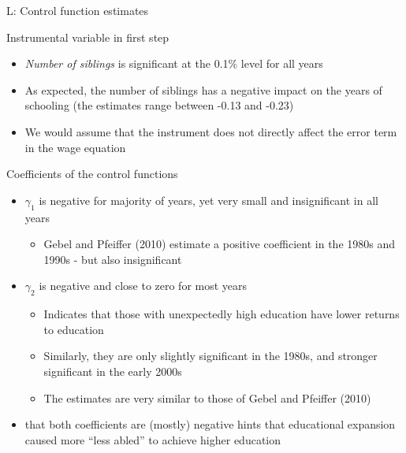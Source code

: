 \documentclass[10pt,ignorenonframetext,]{beamer}
\providecommand{\tightlist}{%
  \setlength{\itemsep}{0pt}\setlength{\parskip}{0pt}}
\begin{document}
\begin{frame}[allowframebreaks]{L: Control function estimates}
\protect\hypertarget{l-control-function-estimates}{}

Instrumental variable in first step

\begin{itemize}
\tightlist
\item
  \emph{Number of siblings} is significant at the 0.1\% level for all
  years
\item
  As expected, the number of siblings has a negative impact on the years
  of schooling (the estimates range between -0.13 and -0.23)
\item
  We would assume that the instrument does not directly affect the error
  term in the wage equation
\end{itemize}

Coefficients of the control functions

\begin{itemize}
\tightlist
\item
  \(\gamma_1\) is negative for majority of years, yet very small and
  insignificant in all years

  \begin{itemize}
  \tightlist
  \item
    Gebel and Pfeiffer (2010) estimate a positive coefficient in the
    1980s and 1990s - but also insignificant
  \end{itemize}
\item
  \(\gamma_2\) is negative and close to zero for most years

  \begin{itemize}
  \tightlist
  \item
    Indicates that those with unexpectedly high education have lower
    returns to education
  \item
    Similarly, they are only slightly significant in the 1980s, and
    stronger significant in the early 2000s
  \item
    The estimates are very similar to those of Gebel and Pfeiffer (2010)
  \end{itemize}
\item
  that both coefficients are (mostly) negative hints that educational
  expansion caused more ``less abled'' to achieve higher education
\end{itemize}

\end{frame}
\end{document}
